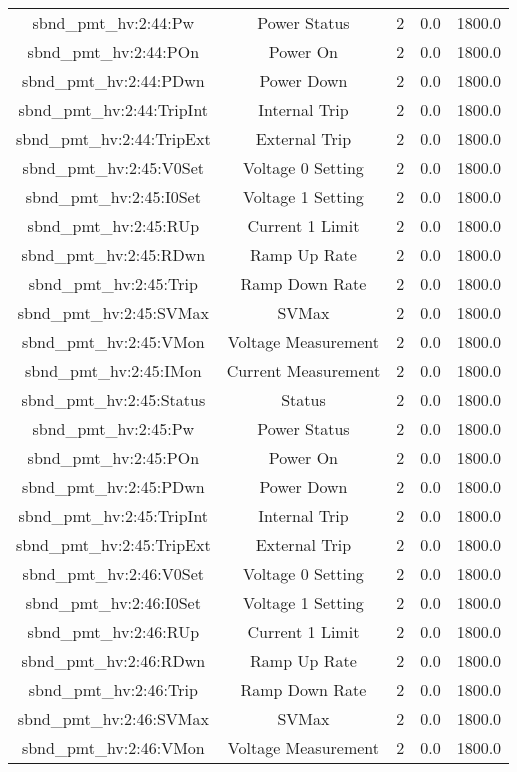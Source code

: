 \begin{table}[ptb]
\begin{tabular}{c | c c c c}
sbnd_pmt_hv:2:44:Pw & Power Status & 2 & 0.0 & 1800.0\\ 
sbnd_pmt_hv:2:44:POn & Power On & 2 & 0.0 & 1800.0\\ 
sbnd_pmt_hv:2:44:PDwn & Power Down & 2 & 0.0 & 1800.0\\ 
sbnd_pmt_hv:2:44:TripInt & Internal Trip & 2 & 0.0 & 1800.0\\ 
sbnd_pmt_hv:2:44:TripExt & External Trip & 2 & 0.0 & 1800.0\\ 
sbnd_pmt_hv:2:45:V0Set & Voltage 0 Setting & 2 & 0.0 & 1800.0\\ 
sbnd_pmt_hv:2:45:I0Set & Voltage 1 Setting & 2 & 0.0 & 1800.0\\ 
sbnd_pmt_hv:2:45:RUp & Current 1 Limit & 2 & 0.0 & 1800.0\\ 
sbnd_pmt_hv:2:45:RDwn & Ramp Up Rate & 2 & 0.0 & 1800.0\\ 
sbnd_pmt_hv:2:45:Trip & Ramp Down Rate & 2 & 0.0 & 1800.0\\ 
sbnd_pmt_hv:2:45:SVMax & SVMax & 2 & 0.0 & 1800.0\\ 
sbnd_pmt_hv:2:45:VMon & Voltage Measurement & 2 & 0.0 & 1800.0\\ 
sbnd_pmt_hv:2:45:IMon & Current Measurement & 2 & 0.0 & 1800.0\\ 
sbnd_pmt_hv:2:45:Status & Status & 2 & 0.0 & 1800.0\\ 
sbnd_pmt_hv:2:45:Pw & Power Status & 2 & 0.0 & 1800.0\\ 
sbnd_pmt_hv:2:45:POn & Power On & 2 & 0.0 & 1800.0\\ 
sbnd_pmt_hv:2:45:PDwn & Power Down & 2 & 0.0 & 1800.0\\ 
sbnd_pmt_hv:2:45:TripInt & Internal Trip & 2 & 0.0 & 1800.0\\ 
sbnd_pmt_hv:2:45:TripExt & External Trip & 2 & 0.0 & 1800.0\\ 
sbnd_pmt_hv:2:46:V0Set & Voltage 0 Setting & 2 & 0.0 & 1800.0\\ 
sbnd_pmt_hv:2:46:I0Set & Voltage 1 Setting & 2 & 0.0 & 1800.0\\ 
sbnd_pmt_hv:2:46:RUp & Current 1 Limit & 2 & 0.0 & 1800.0\\ 
sbnd_pmt_hv:2:46:RDwn & Ramp Up Rate & 2 & 0.0 & 1800.0\\ 
sbnd_pmt_hv:2:46:Trip & Ramp Down Rate & 2 & 0.0 & 1800.0\\ 
sbnd_pmt_hv:2:46:SVMax & SVMax & 2 & 0.0 & 1800.0\\ 
sbnd_pmt_hv:2:46:VMon & Voltage Measurement & 2 & 0.0 & 1800.0\\ 

\end{tabular}
\end{table}
